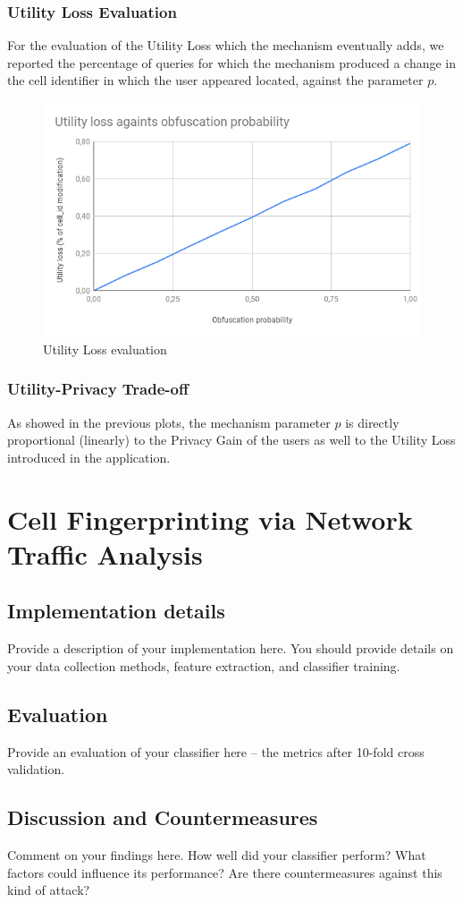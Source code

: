 \documentclass[10pt,conference,compsocconf]{IEEEtran}
\begin{document}
\subsubsection{Utility Loss Evaluation}
For the evaluation of the Utility Loss which the mechanism eventually adds, we
reported the percentage of queries for which the mechanism produced a change in
the cell identifier in which the user appeared located, against the parameter
$p$.
\begin{figure}[h!]
    \centering
    \includegraphics[width=0.9\linewidth]{../privacy_evaluation/utility_loss.png}
    \caption{Utility Loss evaluation}
\end{figure}
\subsubsection{Utility-Privacy Trade-off}
As showed in the previous plots, the mechanism parameter $p$ is directly
proportional (linearly) to the Privacy Gain of the users as well to the Utility
Loss introduced in the application.
\section{Cell Fingerprinting via Network Traffic Analysis}

\subsection{Implementation details}
Provide a description of your implementation here. You should provide details on
your data collection methods, feature extraction, and classifier training.

\subsection{Evaluation}
Provide an evaluation of your classifier here -- the metrics after 10-fold cross
validation.

\subsection{Discussion and Countermeasures}
Comment on your findings here. How well did your classifier perform? What
factors could influence its performance? Are there countermeasures against this
kind of attack?

\printbibliography
\end{document}
